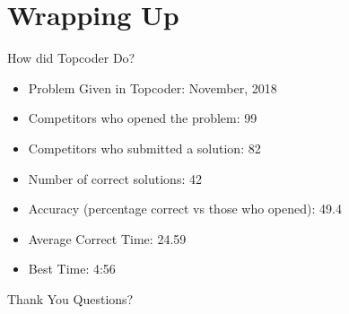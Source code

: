 \documentclass[10pt]{beamer}
\begin{document}
\section{Wrapping Up}

\begin{frame}{How did Topcoder Do?}
  \begin{itemize}
    \item Problem Given in Topcoder: November, 2018
    \item Competitors who opened the problem: 99
    \item Competitors who submitted a solution: 82
    \item Number of correct solutions: 42
    \item Accuracy (percentage correct vs those who opened): 49.4%
    \item Average Correct Time: 24.59
    \item Best Time: 4:56
  \end{itemize}
\end{frame}

\begin{frame}{Thank You}
  \Huge Questions?
\end{frame}
\end{document}
